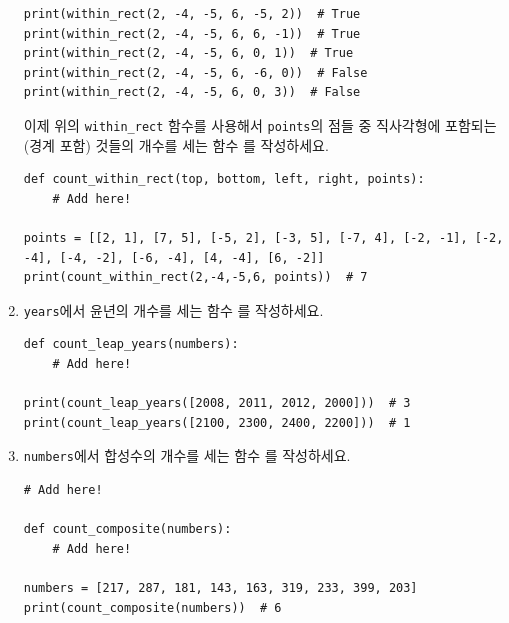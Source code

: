 \documentclass[../main.tex]{subfiles}
\begin{document}
\begin{enumerate}
\begin{verbatim}
print(within_rect(2, -4, -5, 6, -5, 2))  # True
print(within_rect(2, -4, -5, 6, 6, -1))  # True
print(within_rect(2, -4, -5, 6, 0, 1))  # True
print(within_rect(2, -4, -5, 6, -6, 0))  # False
print(within_rect(2, -4, -5, 6, 0, 3))  # False
\end{verbatim}

이제 위의 \verb/within_rect/ 함수를 사용해서 \verb/points/의 점들 중 직사각형에 포함되는 (경계 포함) 것들의 개수를 세는 함수 를 작성하세요.
\begin{verbatim}
def count_within_rect(top, bottom, left, right, points):
    # Add here!

points = [[2, 1], [7, 5], [-5, 2], [-3, 5], [-7, 4], [-2, -1], [-2, -4], [-4, -2], [-6, -4], [4, -4], [6, -2]]
print(count_within_rect(2,-4,-5,6, points))  # 7
\end{verbatim}

\item \verb/years/에서 윤년의 개수를 세는 함수 를 작성하세요.
\begin{verbatim}
def count_leap_years(numbers):
    # Add here!

print(count_leap_years([2008, 2011, 2012, 2000]))  # 3
print(count_leap_years([2100, 2300, 2400, 2200]))  # 1
\end{verbatim}

\item \verb/numbers/에서 합성수의 개수를 세는 함수 를 작성하세요.
\begin{verbatim}
# Add here!

def count_composite(numbers):
    # Add here!

numbers = [217, 287, 181, 143, 163, 319, 233, 399, 203]
print(count_composite(numbers))  # 6
\end{verbatim}
\end{enumerate}
\end{document}
